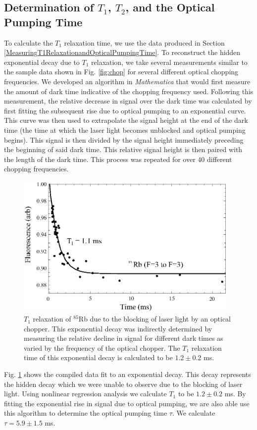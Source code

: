 \subsection{Determination of $T_{1}$, $T_{2}$, and the Optical Pumping Time}\label{DeterminationofTimes}

To calculate the $T_1$ relaxation time, we use the data produced in Section \ref{MeasuringT1RelaxationandOpticalPumpingTime}.  To reconstruct the hidden exponential decay due to $T_1$ relaxation, we take several measurements similar to the sample data shown in Fig. \ref{fig:chop} for several different optical chopping frequencies.  We developed an algorithm in \emph{Mathematica} that would first measure the amount of dark time indicative of the chopping frequency used.  Following this measurement, the relative decrease in signal over the dark time was calculated by first fitting the subsequent rise due to optical pumping to an exponential curve.  This curve was then used to extrapolate the signal height at the end of the dark time (the time at which the laser light becomes unblocked and optical pumping begins).  This signal is then divided by the signal height immediately preceding the beginning of said dark time.  This relative signal height is then paired with the length of the dark time.  This process was repeated for over $40$ different chopping frequencies.  
\begin{figure}[htbp]
\begin{center}
\includegraphics[height=70mm]{./figures/T1.eps}
\caption{\small{$T_1$ relaxation of $^{85}$Rb due to the blocking of laser light by an optical chopper.  This exponential decay was indirectly determined by measuring the relative decline in signal for different dark times as varied by the frequency of the optical chopper.  The $T_1$ relaxation time of this exponential decay is calculated to be $1.2\pm 0.2$ ms.}}
\label{fig:T1}
\end{center}
\end{figure}
Fig. \ref{fig:T1} shows the compiled data fit to an exponential decay.  This decay represents the hidden decay which we were unable to observe due to the blocking of laser light.  Using nonlinear regression analysis we calculate $T_1$ to be $1.2 \pm 0.2$ ms.  By fitting the exponential rise in signal due to optical pumping, we are also able use this algorithm to determine the optical pumping time $\tau$. We calculate $\tau=5.9 \pm 1.5$ ms.  


